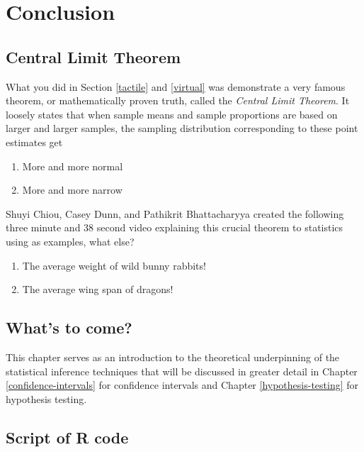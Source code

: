 \documentclass[12pt,]{krantz}
\providecommand{\tightlist}{%
  \setlength{\itemsep}{0pt}\setlength{\parskip}{0pt}}
\begin{document}
\section{Conclusion}\label{conclusion-6}

\subsection{Central Limit Theorem}\label{central-limit-theorem}

What you did in Section \ref{tactile} and \ref{virtual} was demonstrate
a very famous theorem, or mathematically proven truth, called the
\emph{Central Limit Theorem}. It loosely states that when sample means
and sample proportions are based on larger and larger samples, the
sampling distribution corresponding to these point estimates get

\begin{enumerate}
\def\labelenumi{\arabic{enumi}.}
\tightlist
\item
  More and more normal
\item
  More and more narrow
\end{enumerate}

Shuyi Chiou, Casey Dunn, and Pathikrit Bhattacharyya created the
following three minute and 38 second video explaining this crucial
theorem to statistics using as examples, what else?

\begin{enumerate}
\def\labelenumi{\arabic{enumi}.}
\tightlist
\item
  The average weight of wild bunny rabbits!
\item
  The average wing span of dragons!
\end{enumerate}

\subsection{What's to come?}\label{whats-to-come-5}

This chapter serves as an introduction to the theoretical underpinning
of the statistical inference techniques that will be discussed in
greater detail in Chapter \ref{confidence-intervals} for confidence
intervals and Chapter \ref{hypothesis-testing} for hypothesis testing.

\subsection{Script of R code}\label{script-of-r-code-5}
\end{document}
